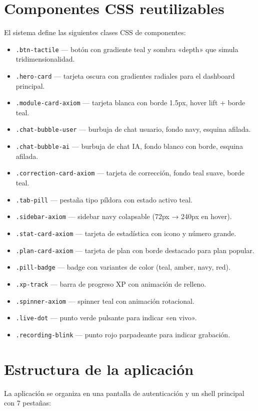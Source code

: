 \documentclass[10pt,a4paper,oneside]{report}
\begin{document}
\section{Componentes CSS reutilizables}
El sistema define las siguientes clases CSS de componentes:

\begin{itemize}[leftmargin=1.4em]
\item \texttt{.btn-tactile} — botón con gradiente teal y sombra «depth» que simula tridimensionalidad.
\item \texttt{.hero-card} — tarjeta oscura con gradientes radiales para el dashboard principal.
\item \texttt{.module-card-axiom} — tarjeta blanca con borde 1.5px, hover lift + borde teal.
\item \texttt{.chat-bubble-user} — burbuja de chat usuario, fondo navy, esquina afilada.
\item \texttt{.chat-bubble-ai} — burbuja de chat IA, fondo blanco con borde, esquina afilada.
\item \texttt{.correction-card-axiom} — tarjeta de corrección, fondo teal suave, borde teal.
\item \texttt{.tab-pill} — pestaña tipo píldora con estado activo teal.
\item \texttt{.sidebar-axiom} — sidebar navy colapsable (72px → 240px en hover).
\item \texttt{.stat-card-axiom} — tarjeta de estadística con icono y número grande.
\item \texttt{.plan-card-axiom} — tarjeta de plan con borde destacado para plan popular.
\item \texttt{.pill-badge} — badge con variantes de color (teal, amber, navy, red).
\item \texttt{.xp-track} — barra de progreso XP con animación de relleno.
\item \texttt{.spinner-axiom} — spinner teal con animación rotacional.
\item \texttt{.live-dot} — punto verde pulsante para indicar «en vivo».
\item \texttt{.recording-blink} — punto rojo parpadeante para indicar grabación.
\end{itemize}

\section{Estructura de la aplicación}
La aplicación se organiza en una pantalla de autenticación y un shell principal con 7 pestañas:
\end{document}
